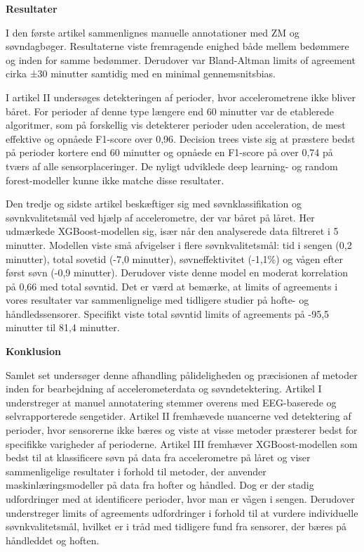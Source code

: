 \documentclass[
  10pt,
]{scrbook}
\begin{document}
\textbf{Resultater}

I den første artikel sammenlignes manuelle annotationer med ZM og
søvndagbøger. Resultaterne viste fremragende enighed både mellem
bedømmere og inden for samme bedømmer. Derudover var Bland-Altman limits
of agreement cirka ±30 minutter samtidig med en minimal gennemsnitsbias.

I artikel II undersøges detekteringen af perioder, hvor accelerometrene
ikke bliver båret. For perioder af denne type længere end 60 minutter
var de etablerede algoritmer, som på forskellig vis detekterer perioder
uden acceleration, de mest effektive og opnåede F1-score over 0,96.
Decision trees viste sig at præstere bedst på perioder kortere end 60
minutter og opnåede en F1-score på over 0,74 på tværs af alle
sensorplaceringer. De nyligt udviklede deep learning- og random
forest-modeller kunne ikke matche disse resultater.

Den tredje og sidste artikel beskæftiger sig med søvnklassifikation og
søvnkvalitetsmål ved hjælp af accelerometre, der var båret på låret. Her
udmærkede XGBoost-modellen sig, især når den analyserede data filtreret
i 5 minutter. Modellen viste små afvigelser i flere søvnkvalitetsmål:
tid i sengen (0,2 minutter), total sovetid (-7,0 minutter),
søvneffektivitet (-1,1\%) og vågen efter først søvn (-0,9 minutter).
Derudover viste denne model en moderat korrelation på 0,66 med total
søvntid. Det er værd at bemærke, at limits of agreements i vores
resultater var sammenlignelige med tidligere studier på hofte- og
håndledssensorer. Specifikt viste total søvntid limits of agreements på
-95,5 minutter til 81,4 minutter.

\textbf{Konklusion}

Samlet set undersøger denne afhandling pålideligheden og præcisionen af
metoder inden for bearbejdning af accelerometerdata og søvndetektering.
Artikel I understreger at manuel annotatering stemmer overens med
EEG-baserede og selvrapporterede sengetider. Artikel II fremhævede
nuancerne ved detektering af perioder, hvor sensorerne ikke bæres og
viste at visse metoder præsterer bedst for specifikke varigheder af
perioderne. Artikel III fremhæver XGBoost-modellen som bedst til at
klassificere søvn på data fra accelerometre på låret og viser
sammenligelige resultater i forhold til metoder, der anvender
maskinlæringsmodeller på data fra hofter og håndled. Dog er der stadig
udfordringer med at identificere perioder, hvor man er vågen i sengen.
Derudover understreger limits of agreements udfordringer i forhold til
at vurdere individuelle søvnkvalitetsmål, hvilket er i tråd med
tidligere fund fra sensorer, der bæres på håndleddet og hoften.
\end{document}
